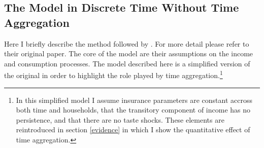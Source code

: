 \documentclass[titlepage]{\econtex}\newcommand{\texname}{BPP_TimeAgg}
\begin{document}
\subsection{The Model in Discrete Time Without Time Aggregation}
Here I briefly describe the method followed by \cite{blundell_consumption_2008}. For more detail please refer to their original paper. The core of the model are their assumptions on the income and consumption processes. The model described here is a simplified version of the original in order to highlight the role played by time aggregation.\footnote{In this simplified model I assume insurance parameters are constant accross both time and households, that the transitory component of income has no persistence, and that there are no taste shocks. These elements are reintroduced in section \ref{evidence} in which I show the quantitative effect of time aggregation.} 
\end{document}
